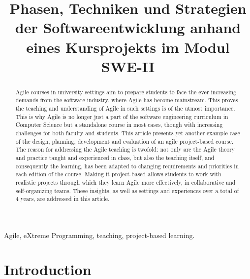 \documentclass[conference]{IEEEtran}
\begin{document}
\title{Phasen, Techniken und Strategien der Softwareentwicklung anhand eines Kursprojekts im Modul SWE-II}

\author{
}

\maketitle

\begin{abstract}
\boldmath
Agile courses in university settings aim to prepare students to face the ever increasing demands from the software industry, where Agile has become mainstream. This proves the teaching and understanding of Agile in such settings is of the utmost importance. This is why Agile is no longer just a part of the software engineering curriculum in Computer Science but a standalone course in most cases, though with increasing challenges for both faculty and students. This article presents yet another example case of the design, planning, development and evaluation of an agile project-based course. The reason for addressing the Agile teaching is twofold: not only are the Agile theory and practice taught and experienced in class, but also the teaching itself, and consequently the learning, has been adapted to changing requirements and priorities in each edition of the course. Making it project-based allows students to work with realistic projects through which they learn Agile more effectively, in collaborative and self-organizing teams. These insights, as well as settings and experiences over a total of 4 years, are addressed in this article.
\end{abstract}

\begin{keywords}
Agile, eXtreme Programming, teaching, project-based learning.
\end{keywords}

\section{Introduction}
\label{sec:intro}
\end{document}
